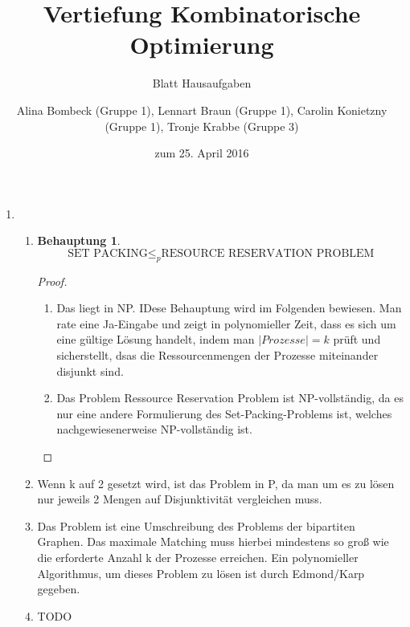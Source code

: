 \documentclass[a4paper]{scrartcl}
\title{Vertiefung Kombinatorische Optimierung}
\subtitle{Blatt {\blattnr} Hausaufgaben}
\author{%
    Alina Bombeck (Gruppe 1),
    Lennart Braun (Gruppe 1),
    Carolin Konietzny (Gruppe 1),
    Tronje Krabbe (Gruppe 3)
}
\date{zum 25. April 2016}
\newtheorem*{proposition}{Behauptung}
\begin{document}
\maketitle


\begin{enumerate}[label=\bfseries \arabic*.]
\item %
\begin{enumerate}
    \item %
    \begin{proposition}
        \[ \text{SET PACKING} \leq_{p} \text{RESOURCE RESERVATION PROBLEM} \]
    \end{proposition}
    \begin{proof}
        \hfill \\
        \begin{enumerate}
            \item Das  liegt in NP. IDese Behauptung wird im Folgenden bewiesen.  
            Man rate eine Ja-Eingabe und zeigt in polynomieller Zeit, dass es sich um eine gültige Lösung handelt, indem man $|Prozesse| = k$ prüft und sicherstellt, dsas die Ressourcenmengen der Prozesse miteinander disjunkt sind.
            \item Das Problem Ressource Reservation Problem ist NP-vollständig, da es nur eine andere Formulierung des Set-Packing-Problems ist, welches nachgewiesenerweise NP-vollständig ist.
        \end{enumerate}
    \end{proof}

    \item %
       Wenn k auf 2 gesetzt wird, ist das Problem in P, da man um es zu lösen nur jeweils 2 Mengen auf Disjunktivität vergleichen muss.


    \item %
     Das Problem ist eine Umschreibung des Problems der bipartiten Graphen. Das maximale Matching muss hierbei mindestens so groß wie die erforderte Anzahl k der Prozesse erreichen. Ein polynomieller Algorithmus, um dieses Problem zu lösen ist durch Edmond/Karp gegeben.

    \item %
        TODO


\end{enumerate}


\end{enumerate}
\end{document}
